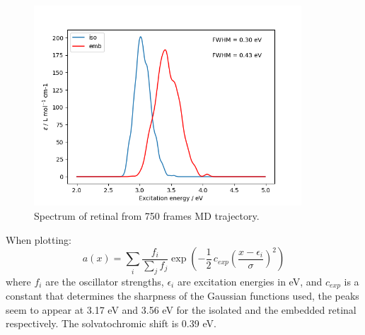 \documentclass[twoside, 12pt]{article}
\begin{document}
\begin{figure}[H]
\centering
\includegraphics[width=10cm]{./figures/both_spectrum_pointy.png}
\caption{Spectrum of retinal from 750 frames MD trajectory.} 
\label{fig:spec_pt}
\end{figure}

When plotting:
\begin{equation}
a(x) = \sum_i \frac{f_i}{\sum_j f_j} \exp\left(-\frac{1}{2}\,c_{exp}\left(\frac{x - \epsilon_i}{\sigma}\right)^{2}\right) 
\label{eq:lineshape}
\end{equation}
where ${f_i}$ are the oscillator strengths, $\epsilon_i$ are excitation energies in eV, and $c_{exp}$ is a constant that determines the sharpness of the Gaussian functions used, the peaks seem to appear at 3.17 eV and 3.56 eV for the isolated and the embedded retinal respectively. The solvatochromic shift is 0.39 eV.
\end{document}
